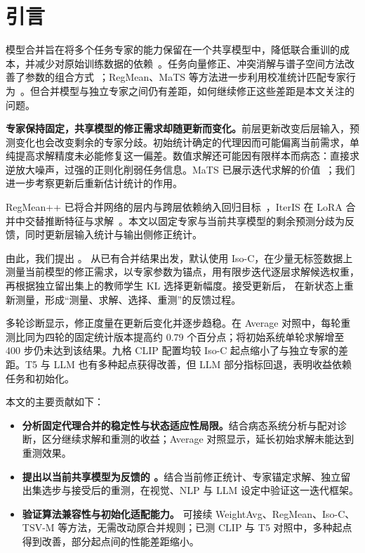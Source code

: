 \section{引言}
\label{sec:introduction}

模型合并旨在将多个任务专家的能力保留在一个共享模型中，降低联合重训的成本，并减少对原始训练数据的依赖~\citep{wortsman2022model,ilharco2023editing}。任务向量修正、冲突消解与谱子空间方法改善了参数的组合方式~\citep{yadav2023ties,marczak2025no}；RegMean、MaTS 等方法进一步利用校准统计匹配专家行为~\citep{jin2023regmean,tam2024mats}。但合并模型与独立专家之间仍有差距，如何继续修正这些差距是本文关注的问题。

\textbf{专家保持固定，共享模型的修正需求却随更新而变化。}前层更新改变后层输入，预测变化也会改变剩余的专家分歧。初始统计确定的代理因而可能偏离当前需求，单纯提高求解精度未必能修复这一偏差。数值求解还可能因有限样本而病态：直接求逆放大噪声，过强的正则化削弱任务信息。MaTS 已展示迭代求解的价值~\citep{tam2024mats}；我们进一步考察更新后重新估计统计的作用。

RegMean++ 已将合并网络的层内与跨层依赖纳入回归目标~\citep{nguyen2026regmeanpp}，IterIS 在 LoRA 合并中交替推断特征与求解~\citep{chen2025iteris}。本文以固定专家与当前共享模型的剩余预测分歧为反馈，同时更新层输入统计与输出侧修正统计。

由此，我们提出 \textbf{\method{}}。\method{} 从已有合并结果出发，默认使用 Iso-C，在少量无标签数据上测量当前模型的修正需求，以专家参数为锚点，用有限步迭代逐层求解候选权重，再根据独立留出集上的教师学生 KL 选择更新幅度。接受更新后，\method{} 在新状态上重新测量，形成“测量、求解、选择、重测”的反馈过程。

多轮诊断显示，修正度量在更新后变化并逐步趋稳。在 Average 对照中，每轮重测比同为四轮的固定统计版本提高约 $0.79$ 个百分点；将初始系统单轮求解增至 400 步仍未达到该结果。九格 CLIP 配置均较 Iso-C 起点缩小了与独立专家的差距。T5 与 LLM 也有多种起点获得改善，但 LLM 部分指标回退，表明收益依赖任务和初始化。

本文的主要贡献如下：
\begin{itemize}
  \setlength{\itemsep}{2pt}
  \item \textbf{分析固定代理合并的稳定性与状态适应性局限。}结合病态系统分析与配对诊断，区分继续求解和重测的收益；Average 对照显示，延长初始求解未能达到重测效果。
  \item \textbf{提出以当前共享模型为反馈的 \method{}。}结合当前修正统计、专家锚定求解、独立留出集选步与接受后的重测，在视觉、NLP 与 LLM 设定中验证这一迭代框架。
  \item \textbf{验证算法兼容性与初始化适配能力。}\method{} 可接续 WeightAvg、RegMean、Iso-C、TSV-M 等方法，无需改动原合并规则；已测 CLIP 与 T5 对照中，多种起点得到改善，部分起点间的性能差距缩小。
\end{itemize}
